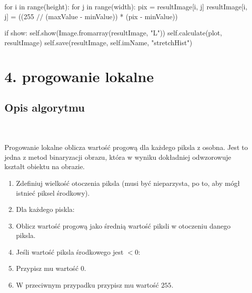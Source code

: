 \documentclass[final,a4paper,openany,12pt]{mwbk}
\begin{document}
\indent \indent \indent for i in range(height): \newline
\indent \indent \indent for j in range(width): \newline
\indent \indent \indent pix = resultImage[i, j] \newline
\indent \indent \indent resultImage[i, j] = ((255 $//$ (maxValue - minValue)) * (pix - minValue)) \newline

\indent \indent \indent if show: \newline
\indent \indent \indent self.show(Image.fromarray(resultImage, "L")) \newline
\indent \indent \indent self.calculate(plot, resultImage) \newline
\indent \indent \indent self.save(resultImage, self.imName, "stretchHist") \newline
\newpage





\section*{4. progowanie lokalne}
\subsection*{Opis algorytmu}
\hfill
\\\\
\indent Progowanie lokalne oblicza wartość progową dla każdego piksla z osobna. Jest to jedna z metod binaryzacji obrazu, która w wyniku dokładniej odwzorowuje kształt obiektu na obrazie.
\begin{enumerate}
	\item Zdefiniuj wielkość otoczenia piksla (musi być nieparzysta, po to, aby mógł istnieć piksel środkowy).
	\item Dla każdego piskla:
	\item Oblicz wartość progową jako średnią wartość piksli w otoczeniu danego piksla.
	\item Jeśli wartość piksla środkowego jest $< 0$:
	\item Przypisz mu wartość $0$.
	\item W przeciwnym przypadku przypisz mu wartość $255$.
\end{enumerate}
\end{document}
